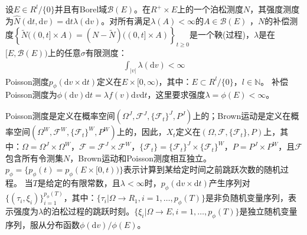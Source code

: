             \begin{definition}[测度论下的Poisson测度]
                设$E\in R^l/ \{0\}$并且有Borel域$\mathcal{B}(E)$。在$R^+\times E$上的一个泊松测度$N$，其强度测度为$\hat{N}(\mathrm{d}t,\mathrm{d}v) = \mathrm{d}t \lambda (\mathrm{d}v)$。对所有满足$\lambda(A)<\infty$的$A\in \mathcal{B}(E)$ ，$N$的补偿测度$\left\{ \tilde{N}((0,t]\times A) = (N- \tilde{N}) ((0,t]\times A)\right\}_{t \geqslant 0}$是一个鞅(过程)，$\lambda $是在$[E,\mathcal{B}(E))$上的任意$\sigma$有限测度：
                \begin{align*}
                    \int_{|v|} \lambda (\mathrm{d}v)< \infty
                \end{align*}
                Poisson测度$p_\phi(\mathrm{d}v\times \mathrm{d}t)$定义在$E\times [0,\infty)$，其中：$E\subset R^l/ \{0\}$，$l\in \mathbb{N}$。
                补偿Poisson测度为$\phi(\mathrm{d}v)\mathrm{d}t = \lambda f(v)\mathrm{d}v\mathrm{d}t$，这里要求强度$\lambda = \phi(E)<\infty$。
            \end{definition}
            \par
            Poisson测度是定义在概率空间$(\Omega^J,\mathcal{F}^J,\{\mathcal{F}_t\}^J,P^J)$上的；Brown运动是定义在概率空间$(\Omega^W,\mathcal{F}^W,\{\mathcal{F}_t\}^W,P^W)$上的，因此，$X_t$定义在$(\Omega,\mathcal{F},\{\mathcal{F}_t\},P)$上，其中：$\Omega = \Omega^J \times \Omega^W$，$\mathcal{F} = \mathcal{F}^J \times \mathcal{F}^W$，$\{\mathcal{F}_t\} = \{\mathcal{F}_t\}^J \times \{\mathcal{F}_t\}^W$，$P = P^J\times P^W$，且$\mathcal{F}$包含所有令测集$N$，Brown运动和Poisson测度相互独立。
            $p_\phi = \{p_\phi(t) = p_\phi(E\times[0,t))\}$表示计算到某给定时间之前跳跃次数的随机过程。
            当$T$是给定的有限常数，且$\lambda < \infty$时，$p_\phi(\mathrm{d}v \times \mathrm{d}t)$产生序列对$\{(\tau_i,\xi_i)\}_{i = 1}^{p_\phi(T)}$，其中：$\{\tau_i|\Omega \rightarrow R_1,i = 1,\dots ,p_\phi(T)\} $是非负随机变量序列，表示强度为$\lambda$的泊松过程的跳跃时刻。$\{\xi_i|\Omega \rightarrow E,i = 1,\dots ,p_\phi(T)\}$是独立随机变量序列，服从分布函数$\phi(\mathrm{d}v)/\phi(E)$。

